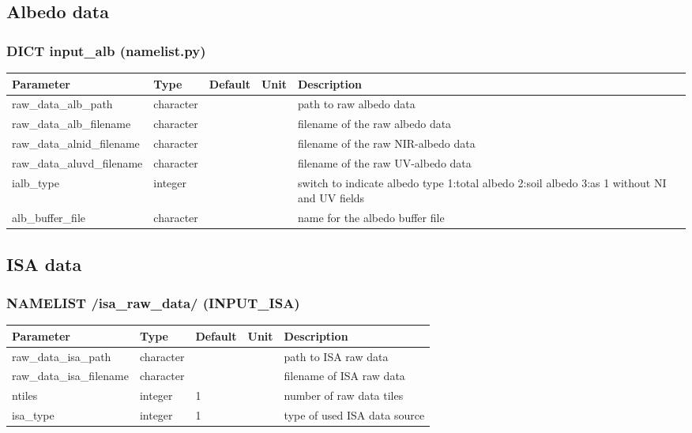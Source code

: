 \documentclass[a4paper,10pt,DIV14,BCOR1cm,titlepage,twoside]{scrartcl}
\providecommand{\tabularnewline}{\\}
\begin{document}
\subsection{Albedo data}\label{namelist_input_for_extpar_albedo}

\subsubsection*{DICT input\_alb (namelist.py)}

\begin{longtable}{|p{4cm}|p{1.5cm}|p{1.5cm}|p{1cm}|p{6cm}|}
\hline 
\textbf{Parameter}& \textbf{Type}& \textbf{Default}& \textbf{Unit}& \textbf{Description}
\tabularnewline
\hline
\endhead
\hline 
raw\_data\_alb\_path & character & & & path to raw albedo data
\tabularnewline
\hline
raw\_data\_alb\_filename & character & & & filename of the raw albedo data
\tabularnewline
\hline
raw\_data\_alnid\_filename & character & & & filename of the raw NIR-albedo data
\tabularnewline
\hline
raw\_data\_aluvd\_filename & character & & & filename of the raw UV-albedo data
\tabularnewline
\hline
ialb\_type & integer &  & & switch to indicate albedo type 1:total albedo 2:soil albedo 3:as 1 without NI and UV fields
\tabularnewline
\hline
alb\_buffer\_file & character & & & name for the albedo buffer file
\tabularnewline
\bottomrule
\end{longtable}

\subsection{ISA data}\label{namelist_input_for_extpar_isa}

\subsubsection*{NAMELIST /isa\_raw\_data/ (INPUT\_ISA)}

\begin{longtable}{|p{4cm}|p{1.5cm}|p{1.5cm}|p{1cm}|p{6cm}|}
\hline 
\textbf{Parameter}& \textbf{Type}& \textbf{Default}& \textbf{Unit}& \textbf{Description}
\tabularnewline
\hline
\endhead
\hline 
raw\_data\_isa\_path & character & &  & path to ISA raw data \tabularnewline
\hline 
raw\_data\_isa\_filename & character & &  & filename of ISA raw data \tabularnewline
\hline
ntiles & integer & 1 &  & number of raw data tiles \tabularnewline
\hline
isa\_type & integer & 1 &  & type of used ISA data source \tabularnewline
\hline
\bottomrule
\end{longtable}
\end{document}
